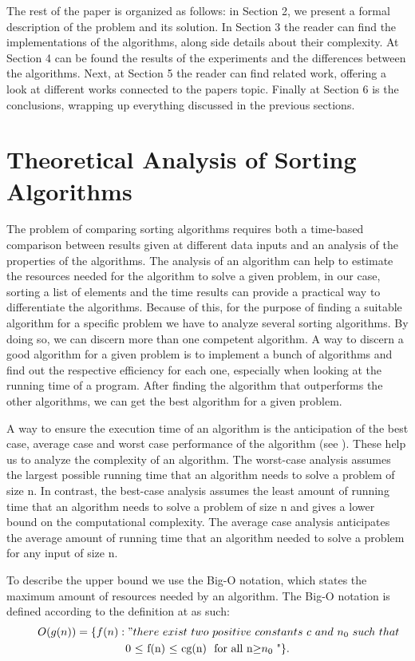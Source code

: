 \documentclass{article}
\numberwithin{figure}{section}
\begin{document}
The rest of the paper is organized as follows: in Section 2, we present a formal description of the problem and its solution. In Section 3 the reader can find the implementations of the algorithms, along side details about their complexity. At Section 4 can be found the results of the experiments and the differences between the algorithms. Next, at Section 5 the reader can find related work, offering a look at different works connected to the papers topic. Finally at Section 6 is the conclusions, wrapping up everything discussed in the previous sections.

\section{Theoretical Analysis of Sorting Algorithms}

The problem of comparing sorting algorithms requires both a time-based comparison between results given at different data inputs and an analysis of the properties of the algorithms. The analysis of an algorithm can help to estimate the resources needed for the algorithm to solve a given problem, in our case, sorting a list of elements and the time results can provide a practical way to differentiate the algorithms. Because of this, for the purpose of finding a suitable algorithm for a specific problem we have to analyze several sorting algorithms. By doing so, we can discern more than one competent algorithm. A way to discern a good algorithm for a given problem is to implement a bunch of algorithms and find out the respective efficiency for each one, especially when looking at the running time of a program. After finding the algorithm that outperforms the other algorithms, we can get the best algorithm for a given problem.

A way to ensure the execution time of an algorithm is the anticipation of the best
case, average case and worst case performance of the algorithm (see \cite{Thomas}\cite{Kurt}). These help us to analyze the complexity of an algorithm. The worst-case analysis assumes the largest possible running time that an algorithm needs to solve a problem of size n. In contrast, the best-case analysis assumes the least amount of running time that an algorithm needs to solve a problem of size n and gives a lower bound on the computational complexity. The average case analysis anticipates the average amount of running time that an algorithm needed to solve a problem for any input of size n. 

To describe the upper bound we use the Big-O notation, which states the maximum amount of resources needed by an algorithm. The Big-O notation is defined according to the definition at \cite{Thomas} as such:
\begin{align*}
O(g(n))=\{f(n):"there\ exist\ two\ positive\ constants\ c\ and\ n_0\ such\ that \endline 
\centerline{0 $\leq$ f(n) $\leq$ cg(n) \ for\ all\ n$\geq$$n_0$ "\}.}
\end {align*}
\end{document}
